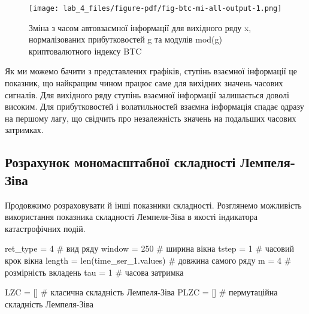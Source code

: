 \documentclass[
  letterpaper,
]{report}
\newenvironment{Shaded}{\begin{snugshade}}{\end{snugshade}}
\newcommand{\BuiltInTok}[1]{\textcolor[rgb]{0.00,0.23,0.31}{#1}}
\newcommand{\CommentTok}[1]{\textcolor[rgb]{0.37,0.37,0.37}{#1}}
\newcommand{\DecValTok}[1]{\textcolor[rgb]{0.68,0.00,0.00}{#1}}
\newcommand{\NormalTok}[1]{\textcolor[rgb]{0.00,0.23,0.31}{#1}}
\newcommand{\OperatorTok}[1]{\textcolor[rgb]{0.37,0.37,0.37}{#1}}
\begin{document}
\begin{figure}[H]

{\centering \texttt{[image: lab\_4\_files/figure-pdf/fig-btc-mi-all-output-1.png]}

}

\caption{\label{fig-btc-mi-all}Зміна з часом автовзаємної інформації для
вихідного ряду x, нормалізованих прибутковостей g та модулів mod(g)
криптовалютного індексу BTC}

\end{figure}

Як ми можемо бачити з представлених графіків, ступінь взаємної
інформації це показник, що найкращим чином працює саме для вихідних
значень часових сигналів. Для вихідного ряду ступінь взаємної інформації
залишається доволі високим. Для прибутковостей і волатильностей взаємна
інформація спадає одразу на першому лагу, що свідчить про незалежність
значень на подальших часових затримках.

\hypertarget{ux440ux43eux437ux440ux430ux445ux443ux43dux43eux43a-ux43cux43eux43dux43eux43cux430ux441ux448ux442ux430ux431ux43dux43eux457-ux441ux43aux43bux430ux434ux43dux43eux441ux442ux456-ux43bux435ux43cux43fux435ux43bux44f-ux437ux456ux432ux430}{%
\subsection{Розрахунок мономасштабної складності
Лемпеля-Зіва}\label{ux440ux43eux437ux440ux430ux445ux443ux43dux43eux43a-ux43cux43eux43dux43eux43cux430ux441ux448ux442ux430ux431ux43dux43eux457-ux441ux43aux43bux430ux434ux43dux43eux441ux442ux456-ux43bux435ux43cux43fux435ux43bux44f-ux437ux456ux432ux430}}

Продовжимо розраховувати й інші показники складності. Розглянемо
можливість використання показника складності Лемпеля-Зіва в якості
індикатора катастрофічних подій.

\begin{Shaded}
\begin{Highlighting}[]
\NormalTok{ret\_type }\OperatorTok{=} \DecValTok{4}                           \CommentTok{\# вид ряду}
\NormalTok{window }\OperatorTok{=} \DecValTok{250}                           \CommentTok{\# ширина вікна}
\NormalTok{tstep }\OperatorTok{=} \DecValTok{1}                              \CommentTok{\# часовий крок вікна }
\NormalTok{length }\OperatorTok{=} \BuiltInTok{len}\NormalTok{(time\_ser\_1.values)        }\CommentTok{\# довжина самого ряду}
\NormalTok{m }\OperatorTok{=} \DecValTok{4}                                  \CommentTok{\# розмірність вкладень }
\NormalTok{tau }\OperatorTok{=} \DecValTok{1}                                \CommentTok{\# часова затримка         }

\NormalTok{LZC }\OperatorTok{=}\NormalTok{ []                               }\CommentTok{\# класична складність Лемпеля{-}Зіва}
\NormalTok{PLZC }\OperatorTok{=}\NormalTok{ []                              }\CommentTok{\# пермутаційна складність Лемпеля{-}Зіва}
\end{Highlighting}
\end{Shaded}
\end{document}
